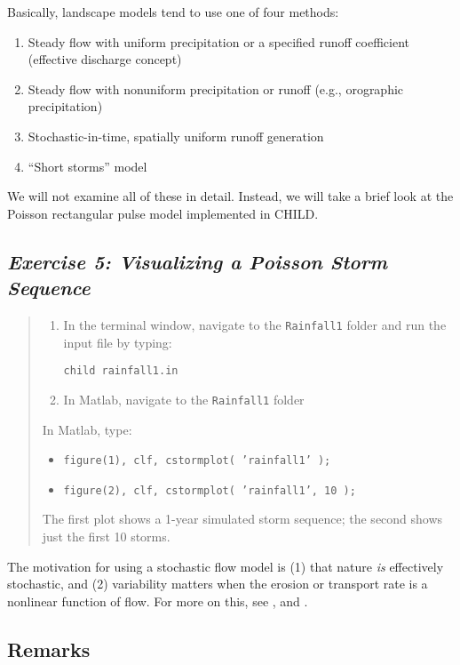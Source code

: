 \documentclass[12pt,reqno]{amsart}
\begin{document}
Basically, landscape models tend to use one of four methods:
\begin{enumerate}
\item Steady flow with uniform precipitation or a specified runoff coefficient (effective discharge concept)
\item Steady flow with nonuniform precipitation or runoff (e.g., orographic precipitation)
\item Stochastic-in-time, spatially uniform runoff generation
\item ``Short storms'' model \citep{solyom2004effect}
\end{enumerate}
We will not examine all of these in detail. Instead, we will take a brief look at the Poisson rectangular pulse model implemented in CHILD.

\subsection*{\em Exercise 5: Visualizing a Poisson Storm Sequence}

\begin{quote}
\small
{\sf
\begin{enumerate}
\item
In the terminal window, navigate to the {\tt Rainfall1} folder and run the input file by typing:

{\tt child rainfall1.in}
\item
In Matlab, navigate to the {\tt Rainfall1} folder
\end{enumerate}
In Matlab, type:
\begin{itemize}
\setcounter{enumi}{2}
\item
{\tt figure(1), clf, cstormplot( 'rainfall1' );}
\item
{\tt figure(2), clf, cstormplot( 'rainfall1', 10 );}
\end{itemize}
The first plot shows a 1-year simulated storm sequence; the second
shows just the first 10 storms.
}
\end{quote}

The motivation for using a stochastic flow model is (1) that nature
{\em is} effectively stochastic, and (2) variability matters when the
erosion or transport rate is a nonlinear function of flow. For more on
this, see
\citet{tucker2000stochastic,snyder2003importance,tucker2004drainage},
and \citet{dibiase2011influence}.

\subsection{Remarks}
\end{document}
